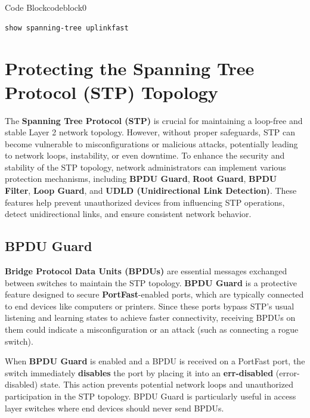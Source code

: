\documentclass[a4paper]{book}
\begin{document}
\begin{enumerate}


	      \begin{ocg}{Code Block}{codeblock}{0}
		      \vspace{0.5cm}
		      \begin{lstlisting}
show spanning-tree uplinkfast
          \end{lstlisting}
	      \end{ocg}

\end{enumerate}

\chapter{Protecting the Spanning Tree Protocol (STP) Topology}


\noindent The \textbf{Spanning Tree Protocol (STP)} is crucial for maintaining a loop-free and stable Layer 2 network topology. However, without proper safeguards, STP can become vulnerable to misconfigurations or malicious attacks, potentially leading to network loops, instability, or even downtime. To enhance the security and stability of the STP topology, network administrators can implement various protection mechanisms, including \textbf{BPDU Guard}, \textbf{Root Guard}, \textbf{BPDU Filter}, \textbf{Loop Guard}, and \textbf{UDLD (Unidirectional Link Detection)}. These features help prevent unauthorized devices from influencing STP operations, detect unidirectional links, and ensure consistent network behavior.

\section*{BPDU Guard}

\textbf{Bridge Protocol Data Units (BPDUs)} are essential messages exchanged between switches to maintain the STP topology. \textbf{BPDU Guard} is a protective feature designed to secure \textbf{PortFast}-enabled ports, which are typically connected to end devices like computers or printers. Since these ports bypass STP’s usual listening and learning states to achieve faster connectivity, receiving BPDUs on them could indicate a misconfiguration or an attack (such as connecting a rogue switch).

When \textbf{BPDU Guard} is enabled and a BPDU is received on a PortFast port, the switch immediately \textbf{disables} the port by placing it into an \textbf{err-disabled} (error-disabled) state. This action prevents potential network loops and unauthorized participation in the STP topology. BPDU Guard is particularly useful in access layer switches where end devices should never send BPDUs.
\end{document}
